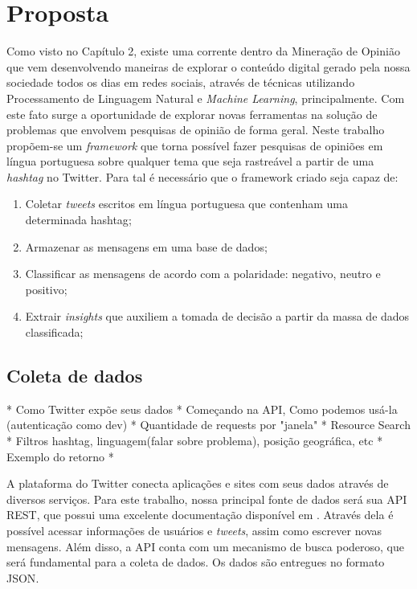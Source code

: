 \chapter{Proposta} \label{cap:proposta}

Como visto no Capítulo 2, existe uma corrente dentro da Mineração de Opinião que vem desenvolvendo maneiras de explorar o conteúdo digital gerado pela nossa sociedade todos os dias em redes sociais, através de técnicas utilizando Processamento de Linguagem Natural e \textit{Machine Learning}, principalmente. Com este fato surge a oportunidade de explorar novas ferramentas na
solução de problemas que envolvem pesquisas de opinião de forma geral.
Neste trabalho propõem-se um \textit{framework} que torna possível fazer pesquisas de opiniões em língua portuguesa sobre qualquer tema que seja rastreável a partir de uma \textit{hashtag} no Twitter.
Para tal é necessário que o framework criado seja capaz de:

\begin{enumerate}
	\item Coletar \textit{tweets} escritos em língua portuguesa que contenham uma determinada {hashtag};
	\item Armazenar as mensagens em uma base de dados;
	\item Classificar as mensagens de acordo com a polaridade: negativo, neutro e positivo;
	\item Extrair \textit{insights} que auxiliem a tomada de decisão a partir da massa de dados classificada;
\end{enumerate}

\section{Coleta de dados}
* Como Twitter expõe seus dados
* Começando na API, Como podemos usá-la (autenticação como dev)
* Quantidade de requests por "janela"
* Resource Search
* Filtros hashtag, linguagem(falar sobre problema), posição geográfica, etc
* Exemplo do retorno
*

A plataforma do Twitter conecta aplicações e sites com seus dados através de diversos serviços. Para este trabalho, nossa principal fonte de dados será sua API REST, que possui uma excelente documentação disponível em \cite{twitterapidocs}. Através dela é possível acessar informações de usuários e \textit{tweets}, assim como escrever novas mensagens. Além disso, a API conta com um mecanismo de busca poderoso, que será fundamental para a coleta de dados. Os dados são entregues no formato \ac{JSON}.

